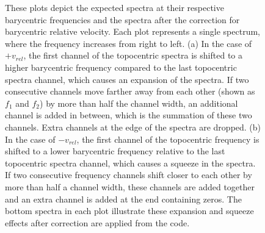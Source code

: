 \begin{figure}[htbp]
    \caption[Barycentric spectral correction]{These plots depict the expected spectra at their respective barycentric frequencies and the spectra after the correction for barycentric relative velocity. Each plot represents a single spectrum, where the frequency increases from right to left. (a) In the case of $+v_{rel}$, the first channel of the topocentric spectra is shifted to a higher barycentric frequency compared to the last topocentric spectra channel, which causes an expansion of the spectra. If two consecutive channels move farther away from each other (shown as $f_1$ and $f_2$) by more than half the channel width, an additional channel is added in between, which is the summation of these two channels. Extra channels at the edge of the spectra are dropped. (b) In the case of $-v_{rel}$, the first channel of the topocentric frequency is shifted to a lower barycentric frequency relative to the last topocentric spectra channel, which causes a squeeze in the spectra. If two consecutive frequency channels shift closer to each other by more than half a channel width, these channels are added together and an extra channel is added at the end containing zeros. The bottom spectra in each plot illustrate these expansion and squeeze effects after correction are applied from the code. 
    }
    \label{fig:spectra_expands_squeeze}
\end{figure}

